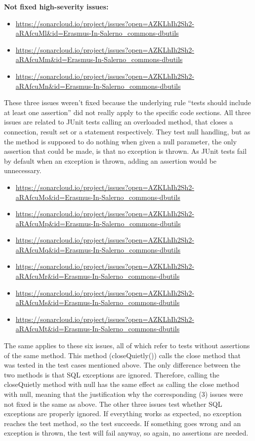\documentclass[sigconf]{acmart}
\begin{document}
\textbf{Not fixed high-severity issues:}
\begin{itemize}
    \item \url{https://sonarcloud.io/project/issues?open=AZKLhIh2Sh2-aRAfcuMl&id=Erasmus-In-Salerno_commons-dbutils}
    \item \url{https://sonarcloud.io/project/issues?open=AZKLhIh2Sh2-aRAfcuMm&id=Erasmus-In-Salerno_commons-dbutils}
    \item \url{https://sonarcloud.io/project/issues?open=AZKLhIh2Sh2-aRAfcuMn&id=Erasmus-In-Salerno_commons-dbutils}
\end{itemize}

These three issues weren’t fixed because the underlying rule “tests should include at least one assertion” did not really apply to the specific code sections. All three issues are related to JUnit tests calling an overloaded method, that closes a connection, result set or a statement respectively. They test null handling, but as the method is supposed to do nothing when given a null parameter, the only assertion that could be made, is that no exception is thrown. As JUnit tests fail by default when an exception is thrown, adding an assertion would be unnecessary.

\begin{itemize}
    \item \url{https://sonarcloud.io/project/issues?open=AZKLhIh2Sh2-aRAfcuMo&id=Erasmus-In-Salerno_commons-dbutils}
    \item \url{https://sonarcloud.io/project/issues?open=AZKLhIh2Sh2-aRAfcuMp&id=Erasmus-In-Salerno_commons-dbutils}
    \item \url{https://sonarcloud.io/project/issues?open=AZKLhIh2Sh2-aRAfcuMq&id=Erasmus-In-Salerno_commons-dbutils}
    \item \url{https://sonarcloud.io/project/issues?open=AZKLhIh2Sh2-aRAfcuMr&id=Erasmus-In-Salerno_commons-dbutils}
    \item \url{https://sonarcloud.io/project/issues?open=AZKLhIh2Sh2-aRAfcuMs&id=Erasmus-In-Salerno_commons-dbutils}
    \item \url{https://sonarcloud.io/project/issues?open=AZKLhIh2Sh2-aRAfcuMt&id=Erasmus-In-Salerno_commons-dbutils}
\end{itemize}

The same applies to these six issues, all of which refer to tests without assertions of the same method. This method (closeQuietly()) calls the close method that was tested in the test cases mentioned above. The only difference between the two methods is that SQL exceptions are ignored. Therefore, calling the closeQuietly method with null has the same effect as calling the close method with null, meaning that the justification why the corresponding (3) issues were not fixed is the same as above. The other three issues test whether SQL exceptions are properly ignored. If everything works as expected, no exception reaches the test method, so the test succeeds. If something goes wrong and an exception is thrown, the test will fail anyway, so again, no assertions are needed.
\end{document}
